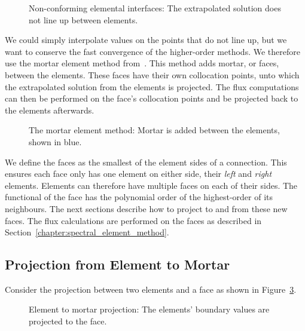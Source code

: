 \begin{figure}[H]
    \centering
    
    \caption{Non-conforming elemental interfaces: The extrapolated solution does not line up between elements.}\label{fig:non_conforming_interfaces}
\end{figure}

We could simply interpolate values on the points that do not line up, but we want to conserve the
fast convergence of the higher-order methods. We therefore use the mortar element method
from~\cite{Maday1989}. This method adds mortar, or faces, between the elements. These faces have
their own collocation points, unto which the extrapolated solution from the elements is projected.
The flux computations can then be performed on the face's collocation points and be projected back
to the elements afterwards.

\begin{figure}[H]
    \centering
    
    \caption{The mortar element method: Mortar is added between the elements, shown in blue.}\label{fig:mortar_element_method}
\end{figure}

We define the faces as the smallest of the element sides of a connection. This ensures each face
only has one element on either side, their \textit{left} and \textit{right} elements. Elements can
therefore have multiple faces on each of their sides. The functional of the face has the polynomial
order of the highest-order of its neighbours. The next sections describe how to project to and from
these new faces. The flux calculations are performed on the faces as described in
Section~\ref{chapter:spectral_element_method}.

\subsection{Projection from Element to Mortar}\label{subsection:adaptive_mesh_refinement:mortar_element_method:element_to_mortar}

Consider the projection between two elements and a face as shown in
Figure~\ref{fig:element_to_mortar}.

\begin{figure}[H]
    \centering
    
    \caption{Element to mortar projection: The elements' boundary values are projected to the face.}\label{fig:element_to_mortar}
\end{figure}

